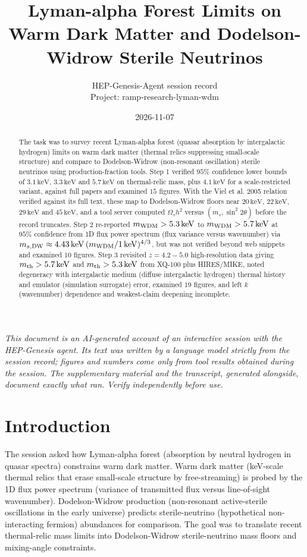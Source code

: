 \documentclass[11pt,a4paper]{article}
\title{Lyman-alpha Forest Limits on Warm Dark Matter and Dodelson-Widrow Sterile Neutrinos}
\author{HEP-Genesis-Agent session record \\ \small Project: ramp-research-lyman-wdm}
\date{2026-11-07}
\begin{document}
\maketitle
\noindent\textit{\small This document is an AI-generated account of an interactive session with the HEP-Genesis agent. Its text was written by a language model strictly from the session record; figures and numbers come only from tool results obtained during the session. The supplementary material and the transcript, generated alongside, document exactly what ran. Verify independently before use.}
\vspace{1em}

\begin{abstract}
The task was to survey recent Lyman-alpha forest (quasar absorption by intergalactic hydrogen) limits on warm dark matter (thermal relics suppressing small-scale structure) and compare to Dodelson-Widrow (non-resonant oscillation) sterile neutrinos using production-fraction tools. Step 1 verified $95\%$ confidence lower bounds of $3.1\,\mathrm{keV}$, $3.3\,\mathrm{keV}$ and $5.7\,\mathrm{keV}$ on thermal-relic mass, plus $4.1\,\mathrm{keV}$ for a scale-restricted variant, against full papers and examined $15$ figures. With the Viel et al. 2005 relation verified against its full text, these map to Dodelson-Widrow floors near $20\,\mathrm{keV}$, $22\,\mathrm{keV}$, $29\,\mathrm{keV}$ and $45\,\mathrm{keV}$, and a tool server computed $\Omega_s h^2$ versus $(m_s, \sin^2 2\theta)$ before the record truncates. Step 2 re-reported $m_{\rm WDM} > 5.3\,\mathrm{keV}$ to $m_{\rm WDM} > 5.7\,\mathrm{keV}$ at $95\%$ confidence from 1D flux power spectrum (flux variance versus wavenumber) via $m_{s,{\rm DW}} \approx 4.43\,\mathrm{keV}\,(m_{\rm WDM}/1\,\mathrm{keV})^{4/3}$, but was not verified beyond web snippets and examined $10$ figures. Step 3 revisited $z = 4.2-5.0$ high-resolution data giving $m_{\rm th} > 5.7\,\mathrm{keV}$ and $m_{\rm th} > 5.3\,\mathrm{keV}$ from XQ-100 plus HIRES/MIKE, noted degeneracy with intergalactic medium (diffuse intergalactic hydrogen) thermal history and emulator (simulation surrogate) error, examined $19$ figures, and left $k$ (wavenumber) dependence and weakest-claim deepening incomplete.
\end{abstract}
\section{Introduction}
The session asked how Lyman-alpha forest (absorption by neutral hydrogen in quasar spectra) constrains warm dark matter. Warm dark matter (keV-scale thermal relics that erase small-scale structure by free-streaming) is probed by the 1D flux power spectrum (variance of transmitted flux versus line-of-sight wavenumber). Dodelson-Widrow production (non-resonant active-sterile oscillations in the early universe) predicts sterile-neutrino (hypothetical non-interacting fermion) abundances for comparison. The goal was to translate recent thermal-relic mass limits into Dodelson-Widrow sterile-neutrino mass floors and mixing-angle constraints.
\end{document}

